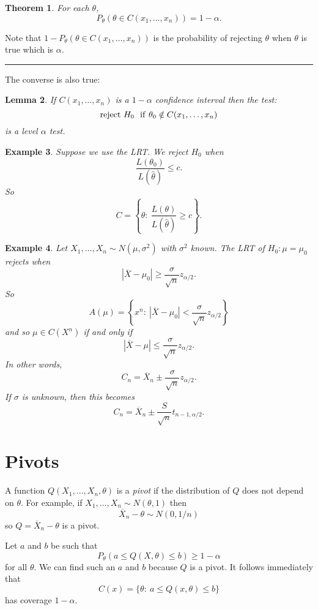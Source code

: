 \documentclass[twoside,12pt]{article}
\newcounter{lecnum}
\newtheorem{theorem}{Theorem}[lecnum]
\newtheorem{lemma}[theorem]{Lemma}
\newtheorem{example}[theorem]{Example}
\newenvironment{proof}{{\bf Proof:}}{\hfill\rule{2mm}{2mm}}
\begin{document}
\begin{theorem}
For each $\theta$,
$$
P_\theta(\theta\in C(x_1,\ldots, x_n)) = 1-\alpha.
$$
\end{theorem}

\begin{proof}
Note that
$1-P_\theta(\theta\in C(x_1,\ldots, x_n))$ 
is the probability of rejecting $\theta$ when $\theta$ is true which is $\alpha$. 
\end{proof}

\vspace{1cm}

The converse is also true:

\begin{lemma}
If $C(x_1,\ldots, x_n)$ is a $1-\alpha$ confidence interval then the test:
$$
{\rm reject\ }H_0\ \ {\rm if\ }\theta_0\notin C(x_1,\ldots, x_n)
$$
is a level $\alpha$ test.
\end{lemma}


\begin{example}
Suppose we use the LRT.
We reject $H_0$ when
$$
\frac{L(\theta_0)}{L(\widehat\theta)} \leq c.
$$
So
$$
C = \left\{ \theta:\ \frac{L(\theta)}{L(\widehat\theta)} \geq c \right\}.
$$
\end{example}

\begin{example}
Let $X_1,\ldots, X_n\sim N(\mu,\sigma^2)$
with $\sigma^2$ known.
The LRT of $H_0:\mu=\mu_0$ rejects when
$$
|\overline{X}-\mu_0| \geq \frac{\sigma}{\sqrt{n}} z_{\alpha/2}.
$$
So
$$
A(\mu) = \left\{ x^n:\ |\overline{X}-\mu_0| < \frac{\sigma}{\sqrt{n}} z_{\alpha/2} \right\}
$$
and
so $\mu\in C(X^n)$ if and only if
$$
|\overline{X}-\mu| \leq \frac{\sigma}{\sqrt{n}} z_{\alpha/2}.
$$
In other words,
$$
C_n = \overline{X}_n \pm \frac{\sigma}{\sqrt{n}} z_{\alpha/2}.
$$
If $\sigma$ is unknown, then this becomes
$$
C_n = \overline{X}_n \pm \frac{S}{\sqrt{n}} t_{n-1,\alpha/2}.
$$
\end{example}


\section{Pivots}

A function
$Q(X_1,\ldots,X_n,\theta)$
is a {\em pivot} if the distribution of $Q$ does not depend on $\theta$.
For example, if
$X_1,\ldots, X_n \sim N(\theta,1)$ then
$$
\overline{X}_n-\theta \sim N(0,1/n)
$$
so
$Q=\overline{X}_n-\theta$ is a pivot.

Let $a$ and $b$ be such that
$$
P_\theta(a \leq Q(X,\theta)\leq b) \geq 1-\alpha
$$
for all $\theta$.
We can find such an $a$ and $b$ because
$Q$ is a pivot.
It follows immediately that
$$
C(x) = \{\theta:\ a \leq Q(x,\theta)\leq b\}
$$
has coverage $1-\alpha$.
\end{document}
